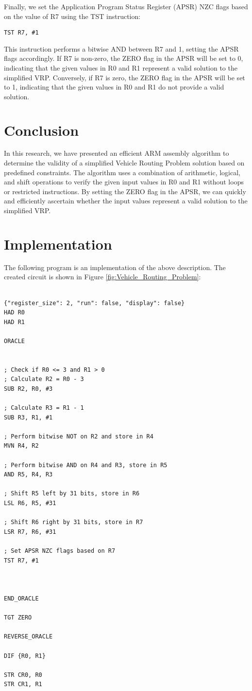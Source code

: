 Finally, we set the Application Program Status Register (APSR) NZC flags based on the value of R7 using the TST instruction:
\begin{verbatim}
TST R7, #1
\end{verbatim}
This instruction performs a bitwise AND between R7 and 1, setting the APSR flags accordingly. If R7 is non-zero, the ZERO flag in the APSR will be set to 0, indicating that the given values in R0 and R1 represent a valid solution to the simplified VRP. Conversely, if R7 is zero, the ZERO flag in the APSR will be set to 1, indicating that the given values in R0 and R1 do not provide a valid solution.

\section{Conclusion}
In this research, we have presented an efficient ARM assembly algorithm to determine the validity of a simplified Vehicle Routing Problem solution based on predefined constraints. The algorithm uses a combination of arithmetic, logical, and shift operations to verify the given input values in R0 and R1 without loops or restricted instructions. By setting the ZERO flag in the APSR, we can quickly and efficiently ascertain whether the input values represent a valid solution to the simplified VRP.



\section{Implementation}

The following program is an implementation of the above description. The created circuit is shown in Figure \ref{fig:Vehicle_Routing_Problem}:

\begin{lstlisting}

{"register_size": 2, "run": false, "display": false}
HAD R0
HAD R1

ORACLE


; Check if R0 <= 3 and R1 > 0
; Calculate R2 = R0 - 3
SUB R2, R0, #3

; Calculate R3 = R1 - 1
SUB R3, R1, #1

; Perform bitwise NOT on R2 and store in R4
MVN R4, R2

; Perform bitwise AND on R4 and R3, store in R5
AND R5, R4, R3

; Shift R5 left by 31 bits, store in R6
LSL R6, R5, #31

; Shift R6 right by 31 bits, store in R7
LSR R7, R6, #31

; Set APSR NZC flags based on R7
TST R7, #1



END_ORACLE

TGT ZERO

REVERSE_ORACLE

DIF {R0, R1}

STR CR0, R0
STR CR1, R1


\end{lstlisting}

